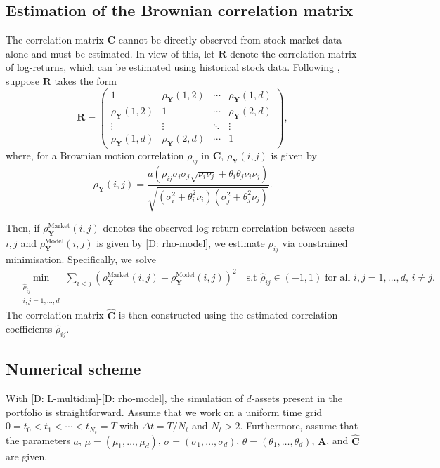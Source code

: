 \subsection{Estimation of the Brownian correlation matrix}
The correlation matrix $\mathbf{C}$ cannot be directly observed from stock market data alone and must be estimated. In view of this, let $\mathbf{R}$ denote the correlation matrix of log-returns, which can be estimated using historical stock data. Following \cite{LUCIANO20101937, Luciano02072016}, suppose $\mathbf R$ takes the form
\begin{equation}
    \mathbf{R} =
    \begin{pmatrix}
        1 & \rho_{\mathbf{Y}}(1,2) & \cdots & \rho_{\mathbf{Y}}(1,d) \\
        \rho_{\mathbf{Y}}(1,2) & 1 & \cdots & \rho_{\mathbf{Y}}(2,d) \\
        \vdots & \vdots & \ddots & \vdots \\
        \rho_{\mathbf{Y}}(1,d) & \rho_{\mathbf{Y}}(2,d) & \cdots & 1
    \end{pmatrix},
    \label{D: R-matrix}
\end{equation}
where, for a Brownian motion correlation $\rho_{ij}$ in $\mathbf C$, $\rho_{\mathbf{Y}}(i,j)$ is given by
\begin{equation}
    \rho_{\mathbf{Y}}(i,j) = \frac{a \left(\rho_{ij} \sigma_i \sigma_j \sqrt{\nu_i \nu_j} + \theta_i \theta_j \nu_i \nu_j\right)}{\sqrt{(\sigma_i^2 + \theta_i^2 \nu_i)(\sigma_j^2 + \theta_j^2 \nu_j)}}.
    \label{D: rho-model}
\end{equation}

Then, if $ \rho^{\text{Market}}_{\mathbf{Y}}(i,j)$ denotes the observed log-return correlation between assets $i, j$ and $\rho^{\text{Model}}_{\mathbf{Y}}(i,j)$ is given by \eqref{D: rho-model}, we estimate $\rho_{ij}$ via constrained minimisation. Specifically, we solve
\begin{align*}
    & \min_{\substack{\hat \rho_{ij} \\ i,j=1,\ldots, d}}\sum_{i<j}\left( \rho^{\text{Market}}_\mathbf{Y}(i,j) - \rho^{\text{Model}}_\mathbf{Y}(i,j) \right)^2 \quad  \text{s.t } \hat \rho_{ij} \in (-1,1) \; \text{for all } i,j = 1,\ldots, d, \, i\neq j.
\end{align*}
The correlation matrix $\hat{\mathbf{C}}$ is then constructed using the estimated correlation coefficients $\hat \rho_{ij}$. 

\subsection{Numerical scheme}
\label{appendix: Numerical scheme}
With \eqref{D: L-multidim}-\eqref{D: rho-model}, the simulation of $d$-assets present in the portfolio is straightforward. Assume that we work on a uniform time grid $0=t_0 < t_1 < \cdots < t_{N_t}=T$ with $\Delta t = T/N_t$ and $N_t>2$. Furthermore, assume that the parameters $a$, $\mu=(\mu_1, \ldots, \mu_d)$, $\sigma=(\sigma_1, \ldots, \sigma_d)$, $\theta=(\theta_1, \ldots, \theta_d)$, $\mathbf{A}$, and $\hat{\mathbf{C}}$ are given.

